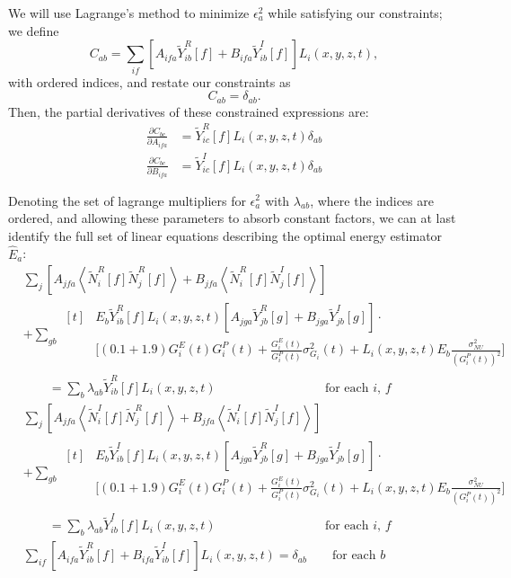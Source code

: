 We will use Lagrange's method to minimize $\epsilon^2_a$ while satisfying our constraints; we define
\[C_{ab} = \sum_{if}\left[A_{ifa} \widetilde{Y}_{ib}^R[f] + B_{ifa} \widetilde{Y}_{ib}^I[f]\right] L_i(x,y,z,t),\]
with ordered indices, and restate our constraints as
\[C_{ab} = \delta_{ab}.\]
Then, the partial derivatives of these constrained expressions are:
\begin{align*}
\frac{\partial C_{bc}}{\partial A_{ifa}} &= \widetilde{Y}^R_{ic}[f] L_i(x,y,z,t) \delta_{ab} \\
\frac{\partial C_{bc}}{\partial B_{ifa}} &= \widetilde{Y}^I_{ic}[f] L_i(x,y,z,t) \delta_{ab}
\end{align*}

Denoting the set of lagrange multipliers for $\epsilon^2_a$ with $\lambda_{ab}$, where the indices are ordered, and allowing these parameters to absorb constant factors, we can at last identify the full set of linear equations describing the optimal energy estimator $\widehat{E}_a$:
\begin{align*}
&\sum_j \left[ A_{jfa} \left<\widetilde{N}_i^R[f]\widetilde{N}_j^R[f]\right> + B_{jfa} \left<\widetilde{N}_i^R[f]\widetilde{N}_j^I[f]\right>\right]\\
&+ \sum_{gb} \begin{aligned}[t]
  & E_b\widetilde{Y}_{ib}^R[f] L_i(x,y,z,t)\left[A_{jga} \widetilde{Y}_{jb}^R[g] + B_{jga} \widetilde{Y}_{jb}^I[g]\right] \cdot \\
  & \bigg[ (0.1 + 1.9) G^E_i(t) G^P_i(t) + \frac{G^E_i(t)}{G^P_i(t)} \sigma^2_{G_i}(t) + L_i(x,y,z,t) E_b \frac{\sigma^2_{NU}}{\left(G^P_i(t)\right)^2} \bigg] \end{aligned} \\
&\qquad = \sum_b \lambda_{ab} \widetilde{Y}^R_{ib}[f] L_i(x,y,z,t) \qquad \qquad \qquad \qquad \medspace \medspace \medspace \text{for each $i$, $f$}\\
%
&\sum_j \left[ A_{jfa} \left<\widetilde{N}_i^I[f]\widetilde{N}_j^R[f]\right> + B_{jfa} \left<\widetilde{N}_i^I[f]\widetilde{N}_j^I[f]\right>\right]\\
&+ \sum_{gb} \begin{aligned}[t]
  & E_b\widetilde{Y}_{ib}^I[f] L_i(x,y,z,t)\left[A_{jga} \widetilde{Y}_{jb}^R[g] + B_{jga} \widetilde{Y}_{jb}^I[g]\right] \cdot \\
  & \bigg[ (0.1 + 1.9) G^E_i(t) G^P_i(t) + \frac{G^E_i(t)}{G^P_i(t)} \sigma^2_{G_i}(t) + L_i(x,y,z,t) E_b \frac{\sigma^2_{NU}}{\left(G^P_i(t)\right)^2} \bigg] \end{aligned} \\
&\qquad = \sum_b \lambda_{ab} \widetilde{Y}^I_{ib}[f] L_i(x,y,z,t) \qquad \qquad \qquad \qquad \medspace \medspace \medspace \text{for each $i$, $f$}\\
%
&\sum_{if}\left[A_{ifa} \widetilde{Y}_{ib}^R[f] + B_{ifa} \widetilde{Y}_{ib}^I[f]\right] L_i(x,y,z,t) = \delta_{ab} \qquad \text{for each $b$}
\end{align*}

